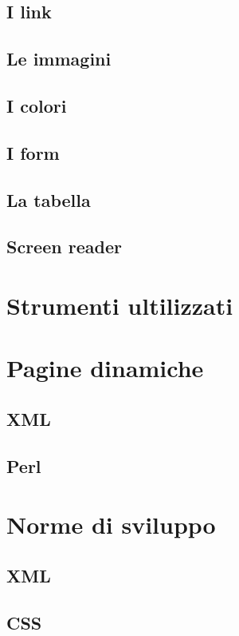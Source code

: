 \documentclass[10pt,a4paper,onecolumn]{article}
\begin{document}
\subsection{I link}

\subsection{Le immagini}

\subsection{I colori}


\subsection{I form}


\subsection{La tabella}


\subsection{Screen reader}

\clearpage

\section{Strumenti ultilizzati}\label{sec:strumenti}

\section{Pagine dinamiche}

\subsection{XML}

\subsection{Perl}

\clearpage

\section{Norme di sviluppo}

\subsection{XML}


\subsection{CSS}
\end{document}

